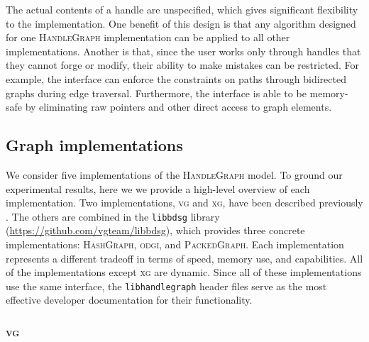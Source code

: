 \documentclass{article}
\begin{document}

The actual contents of a handle are unspecified, which gives significant flexibility to the implementation.
One benefit of this design is that any algorithm designed for one \textsc{HandleGraph} implementation can be applied to all other implementations.
Another is that, since the user works only through handles that they cannot forge or modify, their ability to make mistakes can be restricted.
For example, the interface can enforce the constraints on paths through bidirected graphs during edge traversal.
Furthermore, the interface is able to be memory-safe by eliminating raw pointers and other direct access to graph elements.



\subsection{Graph implementations}

We consider five implementations of the \textsc{HandleGraph} model.
To ground our experimental results, here we we provide a high-level overview of each implementation.
Two implementations, \textsc{vg} and \textsc{xg}, have been described previously \cite{Garrison_2018,Garrison_2019}.
The others are combined in the \texttt{libbdsg} library (\url{https://github.com/vgteam/libbdsg}), which provides three concrete implementations: \textsc{HashGraph}, \textsc{odgi}, and \textsc{PackedGraph}.
Each implementation represents a different tradeoff in terms of speed, memory use, and capabilities.
All of the implementations except \textsc{xg} are dynamic.
Since all of these implementations use the same interface, the \texttt{libhandlegraph} header files serve as the most effective developer documentation for their functionality.

\subsubsection{\textsc{vg}}
\end{document}
